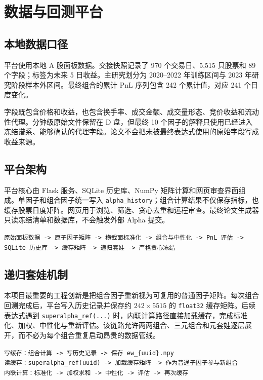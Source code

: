 \documentclass[10pt,a4paper]{article}
\begin{document}
\section{数据与回测平台}
\subsection{本地数据口径}
平台使用本地 A 股面板数据。交接快照记录了 970 个交易日、5,515 只股票和 89 个字段；标签为未来 5 日收益。主研究划分为 2020--2022 年训练区间与 2023 年研究阶段样本外区间。最终组合的累计 PnL 序列包含 242 个累计值，对应 241 个日度变化。

字段既包含价格和收益，也包含换手率、成交金额、成交量形态、竞价收益和流动性代理。分钟级原始文件保留在 D 盘，但最终 10 个因子的解释只使用已经进入冻结谱系、能够确认的代理字段。论文不会把未被最终表达式使用的原始字段写成收益来源。

\subsection{平台架构}
平台核心由 Flask 服务、SQLite 历史库、NumPy 矩阵计算和网页审查界面组成。单因子和组合因子统一写入 \texttt{alpha\_history}；组合计算结果不仅保存指标，也缓存股票日度矩阵。网页用于浏览、筛选、贪心去重和远程审查。最终论文生成器只读冻结清单和数据库，不会触发外部 Alpha 提交。

\begin{center}
\small
\texttt{原始面板数据 -> 原子因子矩阵 -> 横截面标准化 -> 组合与中性化 -> PnL 评估 -> SQLite 历史库 -> 缓存矩阵 -> 递归套娃 -> 严格贪心冻结}
\end{center}

\subsection{递归套娃机制}
本项目最重要的工程创新是把组合因子重新视为可复用的普通因子矩阵。每次组合回测完成后，平台写入历史记录并保存约 $242 \times 5515$ 的 \texttt{float32} 缓存矩阵。后续表达式遇到 \texttt{superalpha\_ref(...)} 时，内联计算路径直接加载缓存，完成标准化、加权、中性化与重新评估。该链路允许两两组合、三元组合和元套娃逐层展开，而不必为每个组合重复启动昂贵的数据管线。

\begin{center}
\small
\texttt{写缓存：组合计算 -> 写历史记录 -> 保存 ew\_\{uuid\}.npy}\\
\texttt{读缓存：superalpha\_ref(uuid) -> 加载缓存矩阵 -> 作为普通子因子参与新组合}\\
\texttt{内联计算：标准化 -> 加权求和 -> 中性化 -> 评估 -> 再次缓存}
\end{center}
\end{document}
